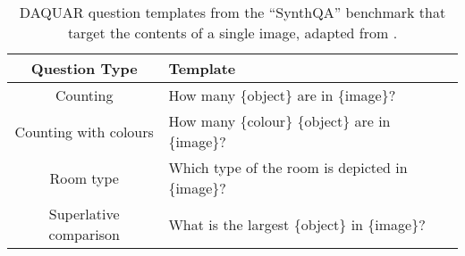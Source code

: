 \begin{table}[htbp]
    \centering
    \begin{tabular}{cl}
        \toprule
        \textbf{Question Type} & \textbf{Template} \\
        \midrule
        Counting & How many \{object\} are in \{image\}?\\
        Counting with colours & How many \{colour\} \{object\} are in \{image\}?\\
        Room type & Which type of the room is depicted in \{image\}?\\
        Superlative comparison & What is the largest \{object\} in \{image\}?\\
        \bottomrule
    \end{tabular}
    \caption[DAQUAR Question templates from, adapted from \cite{malinowski2014multiworld}]{DAQUAR question templates from the ``SynthQA'' benchmark that target the contents of a single image, adapted from \cite{malinowski2014multiworld}.}
    \label{table:daquar_templates}
\end{table}







